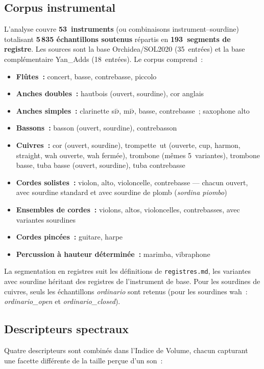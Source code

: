 \documentclass[journal]{IEEEtran}
\begin{document}
\subsection{Corpus instrumental}

L'analyse couvre \textbf{53~instruments} (ou combinaisons instrument--sourdine) totalisant \textbf{5\,835 échantillons soutenus} répartis en \textbf{193~segments de registre}. Les sources sont la base Orchidea/SOL2020 (35~entrées) et la base complémentaire Yan\_Adds (18~entrées). Le corpus comprend~:

\begin{itemize}[nosep]
\item \textbf{Flûtes~:} concert, basse, contrebasse, piccolo
\item \textbf{Anches doubles~:} hautbois (ouvert, sourdine), cor anglais
\item \textbf{Anches simples~:} clarinette si$\flat$, mi$\flat$, basse, contrebasse~; saxophone alto
\item \textbf{Bassons~:} basson (ouvert, sourdine), contrebasson
\item \textbf{Cuivres~:} cor (ouvert, sourdine), trompette~ut (ouverte, cup, harmon, straight, wah ouverte, wah fermée), trombone (mêmes 5~variantes), trombone basse, tuba basse (ouvert, sourdine), tuba contrebasse
\item \textbf{Cordes solistes~:} violon, alto, violoncelle, contrebasse --- chacun ouvert, avec sourdine standard et avec sourdine de plomb (\textit{sordina piombo})
\item \textbf{Ensembles de cordes~:} violons, altos, violoncelles, contrebasses, avec variantes sourdines
\item \textbf{Cordes pincées~:} guitare, harpe
\item \textbf{Percussion à hauteur déterminée~:} marimba, vibraphone
\end{itemize}

La segmentation en registres suit les définitions de \texttt{registres.md}, les variantes avec sourdine héritant des registres de l'instrument de base. Pour les sourdines de cuivres, seuls les échantillons \textit{ordinario} sont retenus (pour les sourdines wah~: \textit{ordinario\_open} et \textit{ordinario\_closed}).

\subsection{Descripteurs spectraux}

Quatre descripteurs sont combinés dans l'Indice de Volume, chacun capturant une facette différente de la \og taille \fg{} perçue d'un son~:
\end{document}
